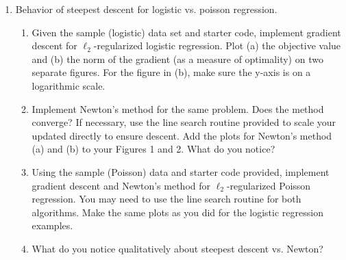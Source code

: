 \documentclass[11pt]{amsart}
\begin{document}
\begin{enumerate}
\begin{enumerate}
\begin{proof}
    Thus, we have that
    $\beta = \lambda_1 = \lambda_{\operatorname{max}} \left(A^TA\right)$, that
    is, the maximum eigenvalue of $A^TA$.
  \end{proof}
\item Find a global bound for $\beta$ of the regularized logistic objective 
\[
\sum_{i=1}^n \log(1+\exp(\langle a_i, x\rangle)) + \frac{\lambda}{2}\|x\|^2. 
\]
\begin{proof}
  If
  $l(x) = \sum_{i=1}^n \log(1+\exp(\langle a_i, x\rangle)) +
  \frac{\lambda}{2}\|x\|^2$, then
  \begin{align*}
    \nabla l(x)
    &= \sum_{i=1}^n a_i\frac{\exp(\langle a_i, x\rangle)}{1+\exp(\langle a_i, x\rangle)} + \lambda x \\
    \nabla^2 l(x)
    &= \sum_{i=1}^n a_ia_i^T\frac{\exp(\langle a_i, x\rangle)}{\left(1+\exp(\langle a_i, x\rangle)\right)^2} + \lambda I_n
      \leq \frac{1}{4} \sum_{i=1}^n a_ia_i^T + \lambda I_n = \frac{1}{4}A^TA + \lambda I_n.
  \end{align*}
  from the derivation in Problem 1. Thus,
  $\beta = \lambda_{\operatorname{max}}\left(\frac{1}{4}A^TA + \lambda I_n\right).$
\end{proof}
\item Do the gradients for Poisson regression admit a global Lipschitz constant? 
\end{enumerate}



\bigskip\bigskip

\item Behavior of steepest descent for logistic vs. poisson regression. 
\begin{enumerate}
\item Given the sample (logistic) data set and starter code, implement gradient descent for $\ell_2$-regularized logistic regression. 
Plot (a) the objective value and (b) the norm of the gradient 
(as a measure of optimality) on two separate figures. For the figure in (b), make sure the y-axis is on a logarithmic scale. 
\item Implement Newton's method for the same problem. Does the method converge? If necessary, use the line search routine provided
to scale your updated directly to ensure descent. Add the plots for Newton's method (a) and (b) to your Figures 1 and 2. What do you notice? 
\item Using the sample (Poisson) data  and starter code provided, implement gradient descent and Newton's method for $\ell_2$-regularized Poisson regression. You may need to use the line search routine for 
both algorithms. Make the same plots as you did for the logistic regression examples. 
\item What do you notice qualitatively about steepest descent vs. Newton?

 
\end{enumerate}

\bigskip\bigskip




\end{enumerate}
\end{document}
